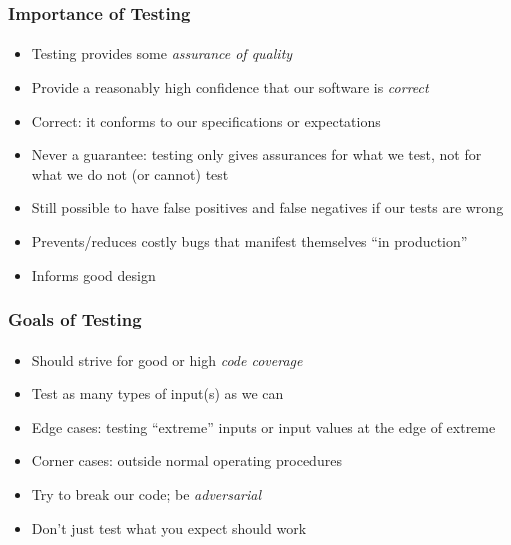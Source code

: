 \documentclass[]{beamer}
\begin{document}
\begin{frame}
    \frametitle{Importance of Testing}
    \framesubtitle{}

\begin{itemize}[<+->]
  \item Testing provides some \emph{assurance of quality}
  \item Provide a reasonably high confidence that our software is \emph{correct}
  \item Correct: it conforms to our specifications or expectations
  \item Never a guarantee: testing only gives assurances for 
    what we test, not for what we do not (or cannot) test 
  \item Still possible to have false positives and false 
    negatives if our tests are wrong
  \item Prevents/reduces costly bugs that manifest themselves ``in production''
  \item Informs good design
\end{itemize}

\end{frame}

\begin{frame}
    \frametitle{Goals of Testing}
    \framesubtitle{}

\begin{itemize}[<+->]
  \item Should strive for good or high \emph{code coverage}
  \item Test as many types of input(s) as we can
  \item Edge cases: testing ``extreme'' inputs or input 
    values at the edge of extreme
  \item Corner cases: outside normal operating procedures 
  \item Try to break our code; be \emph{adversarial}
  \item Don't just test what you expect should work
\end{itemize}

\end{frame}
\end{document}
